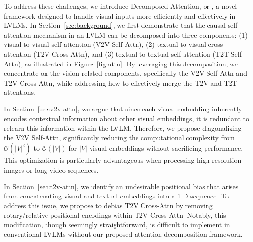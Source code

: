 To address these challenges, we introduce Decomposed Attention, or \method{}, a novel framework designed to handle visual inputs more efficiently and effectively in LVLMs.
In Section~\ref{sec:background}, we first demonstrate that the causal self-attention mechanism \citep{vaswani2017attention} in an LVLM can be decomposed into three components: (1) visual-to-visual self-attention (V2V Self-Attn), (2) textual-to-visual cross-attention (T2V Cross-Attn), and (3) textual-to-textual self-attention (T2T Self-Attn), as illustrated in Figure~\ref{fig:attn}.
By leveraging this decomposition, we concentrate on the vision-related components, specifically the V2V Self-Attn and T2V Cross-Attn, while addressing how to effectively merge the T2V and T2T attentions.


In Section~\ref{sec:v2v-attn}, we argue that since each visual embedding inherently encodes contextual information about other visual embeddings, it is redundant to relearn this information within the LVLM.
Therefore, we propose diagonalizing the V2V Self-Attn, significantly reducing the computational complexity from $\mathcal{O}(|V|^2)$ to $\mathcal{O}(|V|)$ for $|V|$ visual embeddings without sacrificing performance.
This optimization is particularly advantageous when processing high-resolution images or long video sequences.


In Section~\ref{sec:t2v-attn}, we identify an undesirable positional bias that arises from concatenating visual and textual embeddings into a 1-D sequence.
To address this issue, we propose to debias T2V Cross-Attn by removing rotary/relative positional encodings within T2V Cross-Attn.
Notably, this modification, though seemingly straightforward, is difficult to implement in conventional LVLMs without our proposed attention decomposition framework.


